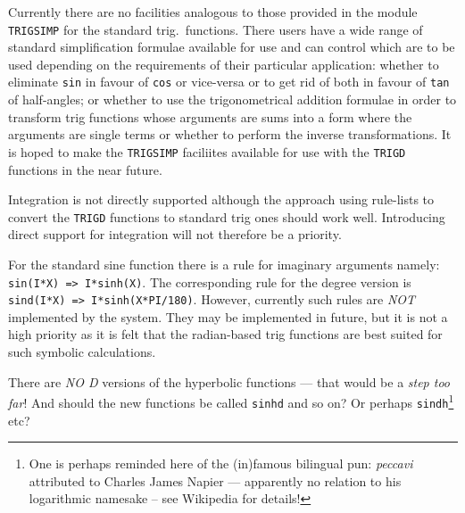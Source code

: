 Currently  there are no facilities analogous to those provided in the module \texttt{TRIGSIMP} for the standard trig.\ functions.  There users have a wide range of  standard simplification formulae available for use and can control which are to be used depending on the  requirements of their particular application: whether to eliminate
 \texttt{sin} in favour of \texttt{cos} or vice-versa or to get rid of both in favour of \texttt{tan} of half-angles; or whether to use the trigonometrical addition formulae in order to transform  trig functions whose arguments are sums into a form where the arguments are single terms or whether to perform the inverse transformations.  It is hoped to make the \texttt{TRIGSIMP}  faciliites available for use with the \texttt{TRIGD} functions in the near future.

Integration is not directly supported although the approach using rule-lists to convert the \texttt{TRIGD} functions  to standard trig ones should work well.  Introducing direct support for integration will not therefore be a priority. 

 For the standard sine function there is a rule for imaginary arguments namely: \texttt{sin(I*X) => I*sinh(X)}. The corresponding rule for the degree version is \texttt{sind(I*X) => I*sinh(X*PI/180)}.  However, currently such rules are \emph{NOT} implemented by the system.  They may be implemented in future, but it is not a high priority as it is felt that the radian-based trig functions are best suited  for such symbolic calculations.

There are \emph{NO D} versions of the hyperbolic functions  --- that would be a {\it step too far}!  And should the new functions be called \texttt{sinhd} and so on? Or perhaps \texttt{sindh}\footnote{One is perhaps reminded here of the (in)famous bilingual pun: \emph{peccavi} attributed to Charles James Napier ---  apparently no relation to his logarithmic namesake -- see Wikipedia for details!} etc?


